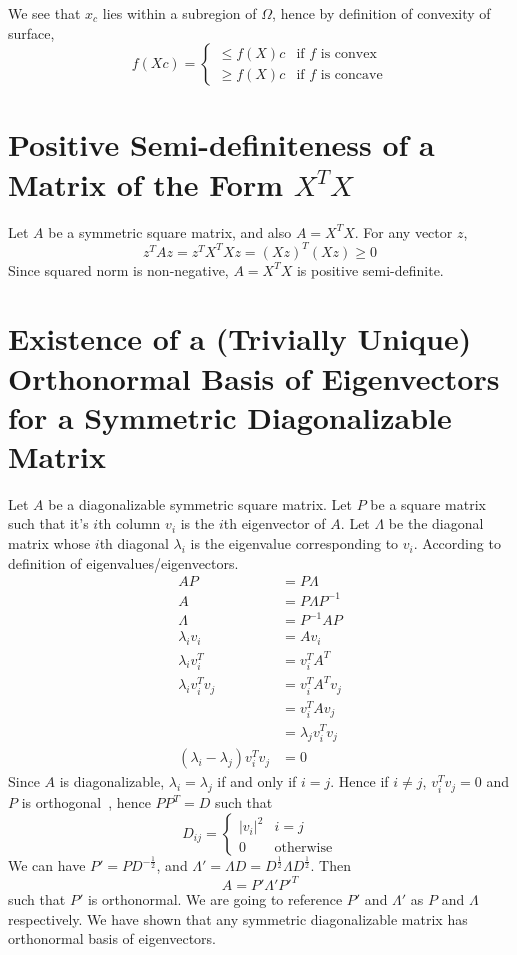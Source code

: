 \documentclass{book}
\numberwithin{equation}{subsection}
\begin{document}
We see that $x_c$ lies within a subregion of $\Omega$, hence by definition of convexity of surface,
\begin{equation}
    f(Xc) =
    \begin{cases}
        \leq  f(X)c & \text{if $f$ is convex}\\
        \geq  f(X)c & \text{if $f$ is concave}
    \end{cases}
\end{equation}
\section{Positive Semi-definiteness of a Matrix of the Form $X^TX$}
Let $A$ be a symmetric square matrix, and also $A=X^TX$. For any vector $z$,
\begin{equation}
z^TAz = z^TX^TXz = (Xz)^T(Xz) \geq 0
\end{equation}
Since squared norm is non-negative, $A=X^TX$ is positive semi-definite.
\section{Existence of a (Trivially Unique) Orthonormal Basis of Eigenvectors for a Symmetric Diagonalizable Matrix}
Let $A$ be a diagonalizable symmetric square matrix. Let $P$ be a square matrix such that it's $i$th column $v_i$ is the $i$th eigenvector of $A$. Let $\Lambda$ be the diagonal matrix whose $i$th diagonal $\lambda_i$ is the eigenvalue corresponding to $v_i$. According to definition of eigenvalues/eigenvectors.
\begin{align}
    AP &= P\Lambda\\
    A &= P\Lambda P^{-1}\\
    \Lambda &= P^{-1}AP\\
    \lambda_iv_i &= Av_i\\
    \lambda_iv_i^T &= v_i^TA^T\\
    \lambda_iv_i^Tv_j &= v_i^TA^Tv_j\\
    &= v_i^TAv_j\\
    &= \lambda_jv_i^Tv_j\\
    (\lambda_i-\lambda_j)v_i^Tv_j &= 0
\end{align}
Since $A$ is diagonalizable, $\lambda_i=\lambda_j$ if and only if $i=j$. Hence if $i \neq j$, $v_i^Tv_j = 0$ and $P$ is orthogonal~\cite{magidin_linear_2011}, hence
$PP^T = D$ such that
\begin{equation}
D_{ij} = \begin{cases}
    |v_i|^2 & i = j\\
    0 & \text{otherwise}
\end{cases}
\end{equation}
We can have $P' = PD^{-\frac{1}{2}}$, and $\Lambda' = \Lambda D = D^{\frac{1}{2}} \Lambda D^{\frac{1}{2}}$. Then
\begin{equation}
    A = P'\Lambda'P'^T
\end{equation}
such that $P'$ is orthonormal. We are going to reference $P'$ and $\Lambda'$ as $P$ and $\Lambda$ respectively. We have shown that any symmetric diagonalizable matrix has orthonormal basis of eigenvectors.
\end{document}
